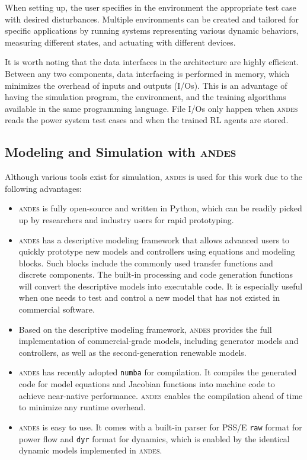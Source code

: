 \documentclass[conference]{IEEEtran}
\newcommand{\andes}{\textsc{andes}\xspace}
\begin{document}
When setting up, the user specifies in the environment the appropriate test case with desired disturbances.
Multiple environments can be created and tailored for specific applications by running systems representing various dynamic behaviors, measuring different states, and actuating with different devices.

It is worth noting that the data interfaces in the architecture are highly efficient. 
Between any two components, data interfacing is performed in memory, which minimizes the overhead of inputs and outputs (I/Os).
This is an advantage of having the simulation program, the environment, and the training algorithms available in the same programming language.
File I/Os only happen when \andes reads the power system test cases and when the trained RL agents are stored.

\subsection{Modeling and Simulation with \andes}
Although various tools exist for simulation, \andes is used for this work due to the following advantages:

\begin{itemize}
    \item \andes is fully open-source and written in Python, which can be readily picked up by researchers and industry users for rapid prototyping.
    \item \andes has a descriptive modeling framework that allows advanced users to quickly prototype new models and controllers using equations and modeling blocks. Such blocks include the commonly used transfer functions and discrete components.
    The built-in processing and code generation functions will convert the descriptive models into executable code.
    It is especially useful when one needs to test and control a new model that has not existed in commercial software.
    \item Based on the descriptive modeling framework, \andes provides the full implementation of commercial-grade models, including generator models and controllers, as well as the second-generation renewable models. 
    \item \andes has recently adopted \texttt{numba} for compilation. It compiles the generated code for model equations and Jacobian functions
    into machine code to achieve near-native performance.
    \andes enables the compilation ahead of time to minimize any runtime overhead.
    \item \andes is easy to use. It comes with a built-in parser for PSS/E \texttt{raw} format for power flow and \texttt{dyr} format for dynamics, which is enabled by the identical dynamic models implemented in \andes.
\end{itemize}
\end{document}
